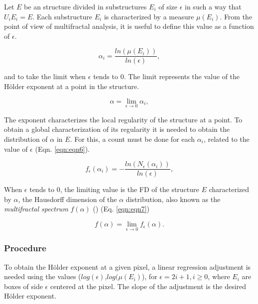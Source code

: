 \documentclass[oneside,a4paper,english,links]{amca}
\begin{document}
Let $E$ be an structure divided in substructures $E_{i}$ of size $\epsilon$ in such a way that $U_{i}E_{i} = E$. Each substructure $E_{i}$ is characterized by a measure $\mu(E_{i})$. From the point of view of multifractal analysis, it is useful to define this value as a function of $\epsilon$.


\begin{equation}
\alpha_{i} = \frac{ln(\mu(E_{i}))}{ln(\epsilon)},
\label{eqn:eqn4}
\end{equation}

and to take the limit when $\epsilon$ tends to $0$. The limit represents the value of the H\"older exponent at a point in the structure.

\begin{equation}
\alpha = \lim_{\epsilon\to0}{\alpha_{i}},
\label{eqn:eqn5}
\end{equation}

The exponent characterizes the local regularity of the structure at a point. To obtain a global characterization of its regularity it is needed to obtain the distribution of $\alpha$ in $E$. For this, a count must be done for each $\alpha_{i}$, related to the value of $\epsilon$ (Eqn. \ref{eqn:eqn6}).

\begin{equation}
f_{\epsilon}(\alpha_{i}) = - \frac{ln(N_{\epsilon}(\alpha_{i}))}{ln(\epsilon)},
\label{eqn:eqn6}
\end{equation}

When $\epsilon$ tends to $0$, the limiting value is the FD of the structure $E$ characterized by $\alpha$, the Hausdorff dimension of the $\alpha$ distribution, also known as the {\em multifractal spectrum} $f(\alpha)$ (\cite{Silvetti2010}) (Eq. \ref{eqn:eqn7})

\begin{equation}
f(\alpha) = \lim_{\epsilon\to0}{f_{\epsilon}(\alpha)}.
\label{eqn:eqn7}
\end{equation}

\subsubsection{Procedure}
To obtain the H\"older exponent at a given pixel, a linear regression adjustment is needed using the values ($log(\epsilon)$,$log(\mu(E_{i})$), for $\epsilon = 2i + 1, i \ge 0$, where $E_{i}$ are boxes of side $\epsilon$ centered at the pixel. The slope of the adjustment is the desired H\"older exponent.
\end{document}
